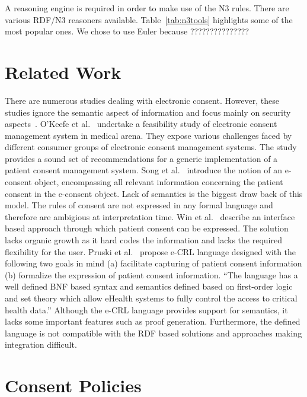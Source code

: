 \documentclass[conference]{IEEEtran}
\begin{document}
A reasoning engine is required in order to make use of the N3 rules.  There are various RDF/N3 reasoners available.
Table~\ref{tab:n3tools} highlights some of the most popular ones. We chose to use Euler because ???????????????


\section{Related Work}
\label{rel-work}

There are numerous studies dealing with electronic consent. However, these studies ignore the semantic aspect of information and focus
mainly on security aspects~\cite{reid2003, chen2009identity, blobel2004authorisation}. O'Keefe et al.~\cite{okeefe2002implementation} undertake a feasibility
study of electronic consent management system in medical arena. They expose various challenges faced by different consumer groups of electronic consent
management systems.  The study provides a sound set of recommendations for a generic implementation of a patient consent management system.
Song et al.~\cite{song2002patient} introduce the notion of an e-consent object, encompassing all relevant information concerning the patient consent in the
e-consent object. Lack of semantics is the biggest draw back of this model.  The rules of consent are not expressed in any formal language and therefore are
ambigious at interpretation time.
Win et al.~\cite{win2002implementing} describe an interface based approach through which patient consent can be expressed.  The solution lacks organic growth as
it hard codes the information and lacks the required flexibility for the user.
Pruski et al.~\cite{pruski2010} propose e-CRL language designed with the following two goals in mind (a) facilitate capturing of patient consent information (b)
formalize the expression of patient consent information.  ``The language has a well defined BNF based syntax and semantics defined based on first-order logic
and set theory which allow eHealth systems to fully control the access to critical health data.''  Although the e-CRL language provides support for semantics,
it lacks some important features such as proof generation.  Furthermore, the defined language is not compatible with the RDF based solutions and approaches
making integration difficult.


\section{Consent Policies}
\label{cons-polic}
\end{document}

